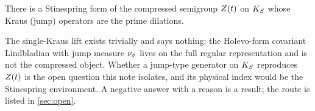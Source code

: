 \begin{conjecture}
\label{conj:stinespring-jump-form}
There is a Stinespring form of the compressed semigroup $Z(t)$ on $K_S$ whose Kraus (jump)
operators are the prime dilations.
\end{conjecture}

The single-Kraus lift exists trivially and says nothing; the Holevo-form covariant
Lindbladian with jump measure $\nu_{\sigma}$ lives on the full regular representation and
is not the compressed object. Whether a jump-type generator on $K_S$ reproduces $Z(t)$ is
the open question this note isolates, and its physical index would be the Stinespring
environment. A negative answer with a reason is a result; the route is listed in
\cref{sec:open}.
